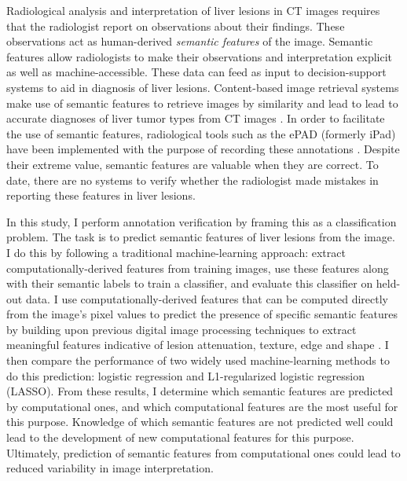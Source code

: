 Radiological analysis and interpretation of liver lesions in CT images requires that the radiologist report on observations about their findings. These observations act as human-derived \emph{semantic features} of the image. Semantic features allow radiologists to make their observations and interpretation explicit as well as machine-accessible. These data can feed as input to decision-support systems to aid in diagnosis of liver lesions. Content-based image retrieval systems make use of semantic features to retrieve images by similarity \cite{Napel:2010vb} and lead to lead to accurate diagnoses of liver tumor types from CT images \cite{Korenblum:2011gx}. In order to facilitate the use of semantic features, radiological tools such as the ePAD (formerly iPad) have been implemented with the purpose of recording these annotations \cite{Rubin:2008uz}. Despite their extreme value, semantic features are valuable when they are correct. To date, there are no systems to verify whether the radiologist made mistakes in reporting these features in liver lesions.

In this study, I perform annotation verification by framing this as a classification problem. The task is to predict semantic features of liver lesions from the image. I do this by following a traditional machine-learning approach: extract computationally-derived features from training images, use these features along with their semantic labels to train a classifier, and evaluate this classifier on held-out data. I use computationally-derived features that can be computed directly from the image's pixel values to predict the presence of specific semantic features by building upon previous digital image processing techniques to extract meaningful features indicative of lesion attenuation, texture, edge and shape \cite{Strela:2002vq,Zhao:2005wb,Hong:2006ti,Manay:2006un,MRangayyan:2005td,Xu:2012bh}. I then compare the performance of two widely used machine-learning methods to do this prediction: logistic regression and L1-regularized logistic regression (LASSO). From these results, I determine which semantic features are predicted by computational ones, and which computational features are the most useful for this purpose. Knowledge of which semantic features are not predicted well could lead to the development of new computational features for this purpose. Ultimately, prediction of semantic features from computational ones could lead to reduced variability in image interpretation.




